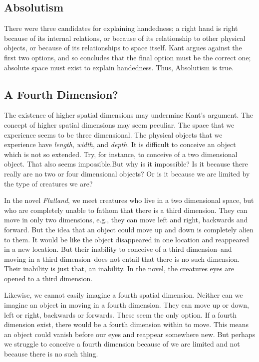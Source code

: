 \documentclass[oneside]{article}
\begin{document}
\subsection*{Absolutism}\label{absolutism}

There were three candidates for explaining handedness; a right hand is right because of its internal relations, or because of its relationship to other physical objects, or because of its relationships to space itself. Kant argues against the first two options, and so concludes that the final option must be the correct one; absolute space must exist to explain handedness. Thus, Absolutism is true. 


\subsection*{A Fourth Dimension?}

The existence of higher spatial dimensions may undermine Kant's argument.  The concept of higher spatial dimensions may seem peculiar. The space that we experience seems to be three dimensional. The physical objects that we experience have \emph{length}, \emph{width}, and \emph{depth}. It is difficult to conceive an object which is not so extended. Try, for instance, to conceive of a two dimensional object. That also seems impossible.But why is it impossible? Is it because there really are no two or four dimensional objects? Or is it because we are limited by the type of creatures we are? 

In the novel \emph{Flatland}, we meet creatures who live in a two dimensional space, but who are completely unable to fathom that there is a third dimension. They can move in only two dimensions, e.g., they can move left and right, backwards and forward. But the idea that an object could move up and down is completely alien to them. It would be like the object disappeared in one location and reappeared in a new location. But their inability to conceive of a third dimension--and moving in a third dimension--does not entail that there is no such dimension. Their inability is just that, an inability. In the novel, the creatures eyes are opened to a third dimension. 

Likewise, we cannot easily imagine a fourth spatial dimension. Neither can we imagine an object in moving in a fourth dimension. They can move up or down, left or right, backwards or forwards. These seem the only option. If a fourth dimension exist, there would be a fourth dimension within to move. This means an object could vanish before our eyes and reappear somewhere new. But perhaps we struggle to conceive a fourth dimension because of we are limited and not because there is no such thing. 
\end{document}
